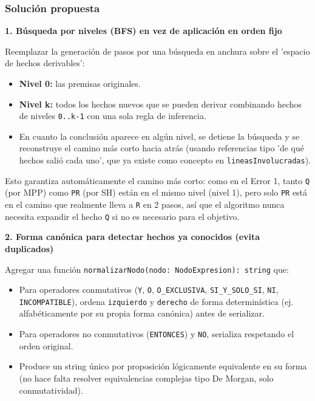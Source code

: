 \documentclass[11pt,a4paper,openany]{book}
\begin{document}
\subsubsection{Solución propuesta}

\textbf{1. Búsqueda por niveles (BFS) en vez de aplicación en orden fijo}

Reemplazar la generación de pasos por una búsqueda en anchura sobre el 'espacio de hechos derivables':

\begin{itemize}[leftmargin=*]
\item \textbf{Nivel 0:} las premisas originales.
\item \textbf{Nivel k:} todos los hechos nuevos que se pueden derivar combinando hechos de niveles \texttt{0..k-1} con una sola regla de inferencia.
\item En cuanto la conclusión aparece en algún nivel, se detiene la búsqueda y se reconstruye el camino más corto hacia atrás (usando referencias tipo 'de qué hechos salió cada uno', que ya existe como concepto en \texttt{lineasInvolucradas}).
\end{itemize}

Esto garantiza automáticamente el camino más corto: como en el Error 1, tanto \texttt{Q} (por MPP) como \texttt{PR} (por SH) están en el mismo nivel (nivel 1), pero solo \texttt{PR} está en el camino que realmente lleva a \texttt{R} en 2 pasos, así que el algoritmo nunca necesita expandir el hecho \texttt{Q} si no es necesario para el objetivo.

\textbf{2. Forma canónica para detectar hechos ya conocidos (evita duplicados)}

Agregar una función \texttt{normalizarNodo(nodo: NodoExpresion): string} que:

\begin{itemize}[leftmargin=*]
\item Para operadores conmutativos (\texttt{Y}, \texttt{O}, \texttt{O\_EXCLUSIVA}, \texttt{SI\_Y\_SOLO\_SI}, \texttt{NI}, \texttt{INCOMPATIBLE}), ordena \texttt{izquierdo} y \texttt{derecho} de forma determinística (ej. alfabéticamente por su propia forma canónica) antes de serializar.
\item Para operadores no conmutativos (\texttt{ENTONCES}) y \texttt{NO}, serializa respetando el orden original.
\item Produce un string único por proposición lógicamente equivalente en su forma (no hace falta resolver equivalencias complejas tipo De Morgan, solo conmutatividad).
\end{itemize}
\end{document}
